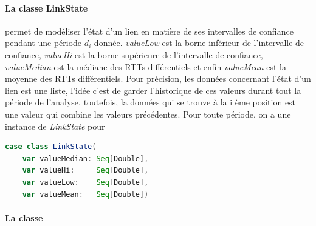 \paragraph{La classe LinkState } permet de modéliser l'état d'un lien en matière de ses intervalles de confiance pendant une période $d_i$ donnée. \textit{valueLow} est la borne inférieur de l'intervalle de confiance, \textit{valueHi} est la borne supérieure de l'intervalle de confiance, \textit{valueMedian} est la médiane des RTTs différentiels et enfin \textit{valueMean} est la moyenne des RTTs différentiels. Pour précision, les données concernant l'état d'un lien est une liste, l'idée c'est de garder l'historique de ces valeurs durant tout la période de l'analyse, toutefois, la données qui se trouve à la i ème position est une valeur qui combine les valeurs précédentes.  Pour toute période, on a une instance de \textit{LinkState} pour 
\begin{lstlisting}[language=scala]
case class LinkState(
	var valueMedian: Seq[Double],
	var valueHi:     Seq[Double],
	var valueLow:    Seq[Double],
	var valueMean:   Seq[Double])
\end{lstlisting}
\paragraph{La classe } 
\begin{lstlisting}[language=scala]

\end{lstlisting}

\begin{figure}[h]
	\centering
		\resizebox{\textwidth}{\textheight}{
	
}
	\caption{}
	\label{fig:process-rttanalysis_tex}
\end{figure}



